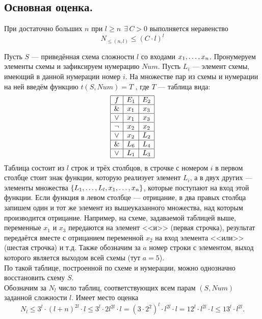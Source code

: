 \subsection{Основная оценка.}
\begin{lemma}
При достаточно больших $n$ при $l\geq n \:\: \exists \, C>0$ выполняется неравенство\\
$$N_{\leq(n,l)}\leq (C\cdot l)^l $$
\end{lemma}
Пусть $S$ --- приведённая схема сложности $l$ со входами $x_1, \ldots, x_n$.
Пронумеруем элементы схемы и зафиксируем нумерацию $Num$. Пусть $L_i$ --- элемент схемы, имеющий в данной нумерации номер $i$. На множестве пар из схемы и нумерации на ней введём функцию
$t(S,Num)= T$%
, где $T$ --- таблица вида:
$$
    \begin{array}{|c|c|c|}
    \hline
       f & E_1 & E_2 \\
      \hline
       \& & x_1 & x_3 \\
      \hline
       \vee & x_1 & x_3 \\
       \hline
       \neg & x_2 & x_2 \\
       \hline
     \vee & x_2 & L_2 \\
     \hline
      \& & L_6 & L_4\\
    \hline
    \vee & L_1 & L_3\\
    \hline
    \end{array}
    $$
Таблица состоит из $l$ строк и трёх столбцов, в строчке с номером $i$ в первом столбце стоит знак функции, которую реализует элемент $L_i$, а в двух других --- элементы множества $\{ L_1,\ldots,L_l, x_1, \ldots, x_n\} $, которые поступают на вход этой функции. %
Если функция в левом столбце --- отрицание, в два правых столбца запишем один и тот же элемент из вышеуказанного множества, над которым производится отрицание. Например, на схеме, задаваемой таблицей выше, переменные $x_1$ и $x_3$ передаются на элемент <<и>> (первая строчка), результат передаётся вместе с отрицанием переменной $x_2$ на вход элемента <<или>> (шестая строчка) и т.д. Также обозначим за $a$ номер строки с элементом, выход которого является выходом всей схемы (тут $a=5$). \\
По такой таблице, построенной по схеме и нумерации, можно однозначно восстановить схему $S$.\\
Обозначим за $N_l$ число таблиц, соответствующих всем парам $(S,Num)$ заданной сложности $l$. Имеет место оценка
$$ N_l\leq 3^l\cdot (l+n)^{2l} \cdot l \leq 3^l \cdot 2l^{2l}\cdot l = (3\cdot 2^2)^l\cdot l^{2l}\cdot l = 12^l \cdot l^{2l} \cdot l \leq 13^l\cdot l^{2l}.$$

